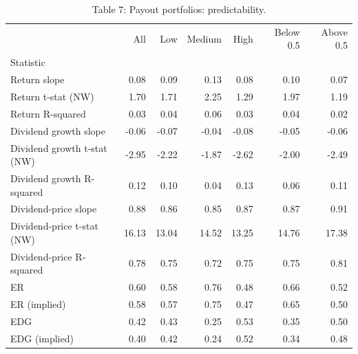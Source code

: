 \begin{table}
\caption{Table 7: Payout portfolios: predictability.}
\label{tab:replication_7}
\begin{tabular}{lrrrrrr}
\toprule
 & All & Low & Medium & High & Below 0.5 & Above 0.5 \\
Statistic &  &  &  &  &  &  \\
\midrule
Return slope & 0.08 & 0.09 & 0.13 & 0.08 & 0.10 & 0.07 \\
Return t-stat (NW) & 1.70 & 1.71 & 2.25 & 1.29 & 1.97 & 1.19 \\
Return R-squared & 0.03 & 0.04 & 0.06 & 0.03 & 0.04 & 0.02 \\
Dividend growth slope & -0.06 & -0.07 & -0.04 & -0.08 & -0.05 & -0.06 \\
Dividend growth t-stat (NW) & -2.95 & -2.22 & -1.87 & -2.62 & -2.00 & -2.49 \\
Dividend growth R-squared & 0.12 & 0.10 & 0.04 & 0.13 & 0.06 & 0.11 \\
Dividend-price slope & 0.88 & 0.86 & 0.85 & 0.87 & 0.87 & 0.91 \\
Dividend-price t-stat (NW) & 16.13 & 13.04 & 14.52 & 13.25 & 14.76 & 17.38 \\
Dividend-price R-squared & 0.78 & 0.75 & 0.72 & 0.75 & 0.75 & 0.81 \\
ER & 0.60 & 0.58 & 0.76 & 0.48 & 0.66 & 0.52 \\
ER (implied) & 0.58 & 0.57 & 0.75 & 0.47 & 0.65 & 0.50 \\
EDG & 0.42 & 0.43 & 0.25 & 0.53 & 0.35 & 0.50 \\
EDG (implied) & 0.40 & 0.42 & 0.24 & 0.52 & 0.34 & 0.48 \\
\bottomrule
\end{tabular}
\end{table}
